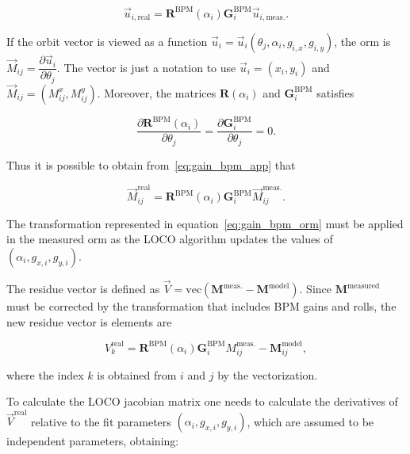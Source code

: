 \begin{equation}
    \vec{u}_{i, \mathrm{real}} = \mathbf{R}^{\mathrm{BPM}}\left(\alpha_i\right) \mathbf{G}_{i}^{\mathrm{BPM}} \vec{u}_{i, \mathrm{meas.}}.
    \label{eq:gain_bpm_app}
\end{equation}

If the orbit vector is viewed as a function $\vec{u}_i = \vec{u}_i\left(\theta_j, \alpha_i, g_{i, x}, g_{i, y}\right)$, the \gls{orm} is $\vec{M}_{ij} = \dfrac{\partial \vec{u}_i}{\partial \theta_j}$. The vector is just a notation to use $\vec{u}_i = (x_i, y_i)$ and $\vec{M}_{ij} = \left(M_{ij}^x, M_{ij}^y\right)$. Moreover, the matrices $\mathbf{R}\left(\alpha_i\right)$ and $\mathbf{G}_{i}^{\mathrm{BPM}}$ satisfies

\begin{equation*}
\dfrac{\partial \mathbf{R}^\mathrm{BPM}\left(\alpha_i\right)}{ \partial  \theta_j} = \dfrac{\partial \mathbf{G}_{i}^{\mathrm{BPM}}}{ \partial \theta_j} = 0.
\end{equation*}

Thus it is possible to obtain from~\eqref{eq:gain_bpm_app} that

\begin{equation}
    \vec{M}_{ij}^{\mathrm{real}} = \mathbf{R}^\mathrm{BPM}\left(\alpha_i\right) \mathbf{G}_{i}^{\mathrm{BPM}} \vec{M}_{ij}^{\mathrm{meas.}}.
    \label{eq:gain_bpm_orm}
\end{equation}

The transformation represented in equation~\eqref{eq:gain_bpm_orm} must be applied in the measured \gls{orm} as the LOCO algorithm updates the values of $\left(\alpha_i, g_{x, i}, g_{y, i}\right)$. 

The residue vector is defined as $\vec{V} = \mathrm{vec}\left(\mathbf{M}^{\mathrm{meas.}} - \mathbf{M}^{\mathrm{model}}\right)$. Since $\mathbf{M}^{\mathrm{measured}}$ must be corrected by the transformation that includes BPM gains and rolls, the new residue vector is elements are 

\begin{equation}
    {V}_k^{\mathrm{real}} = \mathbf{R}^\mathrm{BPM}\left(\alpha_i\right) \mathbf{G}_{i}^{\mathrm{BPM}} {M}^{\mathrm{meas.}}_{ij} - \mathbf{M}^{\mathrm{model}}_{ij},
\end{equation}

where the index $k$ is obtained from $i$ and $j$ by the vectorization. 

To calculate the LOCO jacobian matrix one needs to calculate the derivatives of $\vec{V}^{\mathrm{real}}$ relative to the fit parameters $\left(\alpha_i, g_{x, i}, g_{y, i}\right)$, which are assumed to be independent parameters, obtaining:

